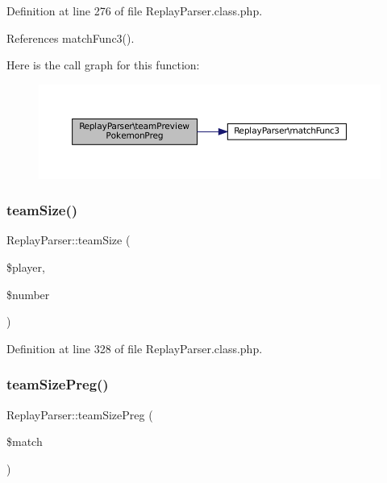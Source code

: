 Definition at line 276 of file Replay\+Parser.\+class.\+php.



References match\+Func3().

Here is the call graph for this function\+:\nopagebreak
\begin{figure}[H]
\begin{center}
\leavevmode
\includegraphics[width=350pt]{class_replay_parser_a9450b4b031bb492a63c22d86a50dc9c2_cgraph}
\end{center}
\end{figure}
\mbox{\label{class_replay_parser_aa7a6115ff4ea8b4a3f765a963c55d9fd}} 
\subsubsection{\texorpdfstring{team\+Size()}{teamSize()}}
{\footnotesize\ttfamily Replay\+Parser\+::team\+Size (\begin{DoxyParamCaption}\item[{}]{\$player,  }\item[{}]{\$number }\end{DoxyParamCaption})}



Definition at line 328 of file Replay\+Parser.\+class.\+php.

\mbox{\label{class_replay_parser_a46cb2149fb24bf3a9674c544caee3fcf}} 
\subsubsection{\texorpdfstring{team\+Size\+Preg()}{teamSizePreg()}}
{\footnotesize\ttfamily Replay\+Parser\+::team\+Size\+Preg (\begin{DoxyParamCaption}\item[{}]{\$match }\end{DoxyParamCaption})}



